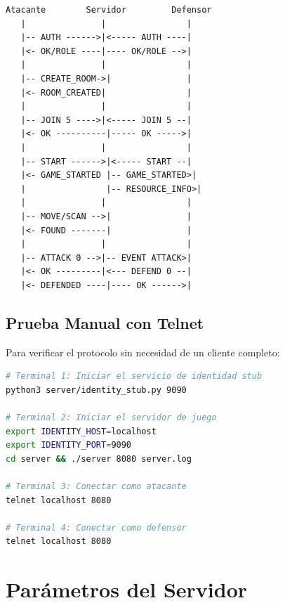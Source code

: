 \documentclass[12pt, letterpaper]{article}
\begin{document}
\begin{lstlisting}
Atacante        Servidor         Defensor
   |               |                |
   |-- AUTH ------>|<----- AUTH ----|
   |<- OK/ROLE ----|---- OK/ROLE -->|
   |               |                |
   |-- CREATE_ROOM->|               |
   |<- ROOM_CREATED|                |
   |               |                |
   |-- JOIN 5 ---->|<----- JOIN 5 --|
   |<- OK ----------|----- OK ----->|
   |               |                |
   |-- START ------>|<----- START --|
   |<- GAME_STARTED |-- GAME_STARTED>|
   |                |-- RESOURCE_INFO>|
   |               |                |
   |-- MOVE/SCAN -->|               |
   |<- FOUND -------|               |
   |               |                |
   |-- ATTACK 0 -->|-- EVENT ATTACK>|
   |<- OK ---------|<--- DEFEND 0 --|
   |<- DEFENDED ----|---- OK ------>|
\end{lstlisting}

\subsection{Prueba Manual con Telnet}

Para verificar el protocolo sin necesidad de un cliente completo:

\begin{lstlisting}[language=bash]
# Terminal 1: Iniciar el servicio de identidad stub
python3 server/identity_stub.py 9090

# Terminal 2: Iniciar el servidor de juego
export IDENTITY_HOST=localhost
export IDENTITY_PORT=9090
cd server && ./server 8080 server.log

# Terminal 3: Conectar como atacante
telnet localhost 8080

# Terminal 4: Conectar como defensor
telnet localhost 8080
\end{lstlisting}

\section{Parámetros del Servidor}
\end{document}
